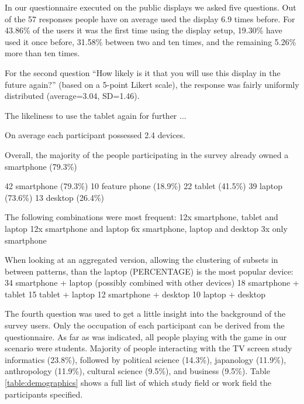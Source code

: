 	





	In our questionnaire executed on the public displays we asked five questions. Out of the 57 responses people have on average used the display 6.9 times before. For 43.86\% of the users it was the first time using the display setup, 19.30\% have used it once before, 31.58\% between two and ten times, and the remaining 5.26\% more than ten times.

	For the second question ``How likely is it that you will use this display in the future again?'' (based on a 5-point Likert scale), the response was fairly uniformly distributed (average=3.04, SD=1.46).

		The likeliness to use the tablet again for further ...


	On average each participant possessed 2.4 devices. 

	Overall, the majority of the people participating in the survey already owned a smartphone (79.3\%)

		42	smartphone (79.3\%)
		10	feature phone (18.9\%)
		22	tablet (41.5\%)
		39	laptop (73.6\%)
		13	desktop (26.4\%)

	The following combinations were most frequent: 
		12x smartphone, tablet and laptop
		12x smartphone and laptop
		6x smartphone, laptop and desktop
		3x only smartphone

	When looking at an aggregated version, allowing the clustering of subsets in between patterns, than the laptop (PERCENTAGE) is the most popular device:
		34 	smartphone + laptop (possibly combined with other devices)
		18	smartphone + tablet
		15	tablet + laptop
		12	smartphone + desktop
		10 	laptop + desktop


	The fourth question was used to get a little insight into the background of the survey users. Only the occupation of each participant can be derived from the questionnaire. As far as was indicated, all people playing with the game in our scenario were students. Majority of people interacting with the TV screen study informatics (23.8\%), followed by political science (14.3\%), japanology (11.9\%), anthropology (11.9\%), cultural science (9.5\%), and business (9.5\%). Table \ref{table:demographics} shows a full list of which study field or work field the participants specified.


